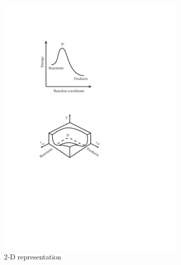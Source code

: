 \documentclass[preprint, 11pt]{elsarticle} %
\begin{document}
\begin{figure}[htbp]
\centering
\begin{subfigure}[t]{.5\textwidth}
  \centering
  \includegraphics{TST-2D-PES.pdf}
  \caption{2-D representation}
  \label{fig:sub1}
\end{subfigure}%
\begin{subfigure}[t]{.5\textwidth}
  \centering

\end{subfigure}
\end{figure}
\end{document}
